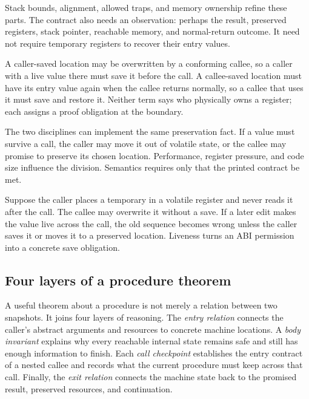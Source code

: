 Stack bounds, alignment, allowed traps, and memory ownership refine these
parts. The contract also needs an observation: perhaps the result, preserved
registers, stack pointer, reachable memory, and normal-return outcome. It need
not require temporary registers to recover their entry values.

\begin{definition}[title={Caller-saved and callee-saved name obligations}]
A caller-saved location may be overwritten by a conforming callee, so a caller
with a live value there must save it before the call. A callee-saved location
must have its entry value again when the callee returns normally, so a callee
that uses it must save and restore it. Neither term says who physically owns a
register; each assigns a proof obligation at the boundary.
\end{definition}

The two disciplines can implement the same preservation fact. If a value must
survive a call, the caller may move it out of volatile state, or the callee may
promise to preserve its chosen location. Performance, register pressure, and
code size influence the division. Semantics requires only that the printed
contract be met.

\begin{example}[title={A value that is dead needs no ceremony}]
Suppose the caller places a temporary in a volatile register and never reads
it after the call. The callee may overwrite it without a save. If a later edit
makes the value live across the call, the old sequence becomes wrong unless
the caller saves it or moves it to a preserved location. Liveness turns an ABI
permission into a concrete save obligation.
\end{example}

\subsection{Four layers of a procedure theorem}

A useful theorem about a procedure is not merely a relation between two
snapshots. It joins four layers of reasoning. The \emph{entry relation}
connects the caller's abstract arguments and resources to concrete machine
locations. A \emph{body invariant} explains why every reachable internal
state remains safe and still has enough information to finish. Each
\emph{call checkpoint} establishes the entry contract of a nested callee and
records what the current procedure must keep across that call. Finally, the
\emph{exit relation} connects the machine state back to the promised result,
preserved resources, and continuation.

